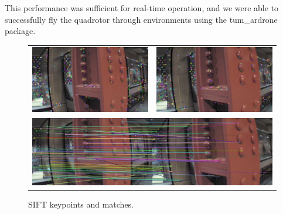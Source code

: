 \documentclass{acmsiggraph}
\begin{document}
This performance was sufficient for real-time operation, and we were able to successfully fly the quadrotor through environments using the tum\_ardrone package.

\begin{figure}[h]
  \centering
  \begin{tabular}{cc}
    \includegraphics[resolution=150, scale=0.75]{images/sift-kp1} &
    \includegraphics[resolution=150, scale=0.75]{images/sift-kp2} \\
    \multicolumn{2}{c}{\includegraphics[resolution=150, scale=0.77]{images/sift-matches}}
  \end{tabular}
  \caption{SIFT keypoints and matches.}
  \label{fig:sift-ex}
\end{figure}
\end{document}
